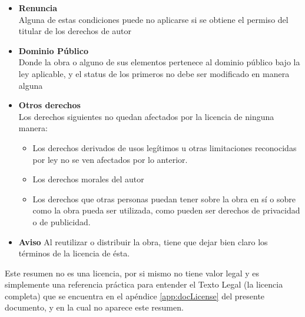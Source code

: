 	  \begin{itemize}
            \item {\textbf{Renuncia}\\
	      Alguna de estas condiciones puede no aplicarse si se obtiene el permiso del titular de los derechos de autor}
	    
	    \item {\textbf{Dominio Público}\\
		Donde la obra o alguno de sus elementos pertenece al dominio público bajo la ley aplicable, y el status de los primeros no debe ser modificado en manera alguna}
	    
	    \item {\textbf{Otros derechos}\\
	      Los derechos siguientes no quedan afectados por la licencia de ninguna manera:
	     
	      \begin{itemize}

		\item{Los derechos derivados de usos legítimos u otras limitaciones reconocidas por ley no se ven afectados por lo anterior.}
		\item{Los derechos morales del autor}
		\item{Los derechos que otras personas puedan tener sobre la obra en sí o sobre como la obra pueda ser utilizada, como pueden ser derechos de privacidad o de publicidad.}
	      \end{itemize}
	    }
	    
            \item{\textbf{Aviso}
	      Al reutilizar o distribuir la obra, tiene que dejar bien claro los términos de la licencia de ésta.}
	    

          \end{itemize}
          
Este resumen no es una licencia, por si mismo no tiene valor legal y es simplemente una referencia práctica para entender el Texto Legal (la licencia completa) que se encuentra en el apéndice \ref{app:docLicense} del presente documento, y en la cual no aparece este resumen.
